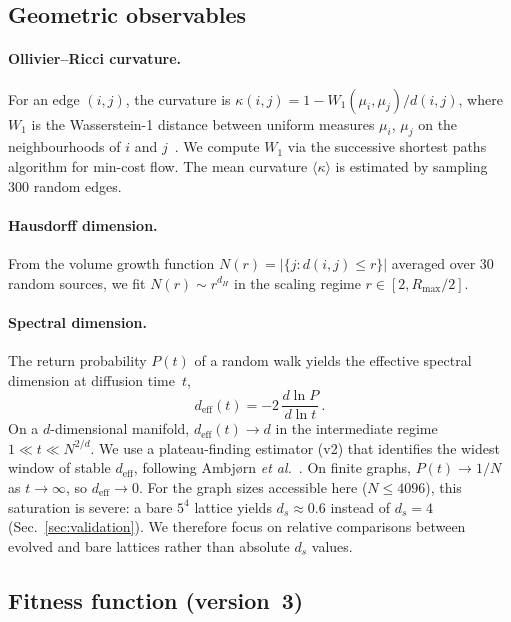 \documentclass[aps,prd,twocolumn,superscriptaddress,floatfix]{revtex4-2}
\begin{document}
\subsection{Geometric observables}
\label{sec:observables}

\paragraph{Ollivier--Ricci curvature.}
For an edge $(i,j)$, the curvature is
$\kappa(i,j) = 1 - W_1(\mu_i, \mu_j) / d(i,j)$, where $W_1$ is
the Wasserstein-1 distance between uniform measures $\mu_i$, $\mu_j$
on the neighbourhoods of $i$ and $j$~\cite{Ollivier2009,Lin2011}.
We compute $W_1$ via the successive shortest paths algorithm for
min-cost flow.  The mean curvature
$\langle\kappa\rangle$ is estimated by sampling 300 random edges.

\paragraph{Hausdorff dimension.}
From the volume growth function $N(r) = |\{j : d(i,j) \leq r\}|$
averaged over 30 random sources, we fit $N(r) \sim r^{d_H}$ in the
scaling regime $r \in [2, R_{\max}/2]$.

\paragraph{Spectral dimension.}
The return probability $P(t)$ of a random walk yields the effective
spectral dimension at diffusion time~$t$,
\begin{equation}
  d_{\mathrm{eff}}(t) = -2\,\frac{d\ln P}{d\ln t} \,.
\end{equation}
On a $d$-dimensional manifold, $d_{\mathrm{eff}}(t) \to d$ in the
intermediate regime $1 \ll t \ll N^{2/d}$.  We use a plateau-finding
estimator (v2) that identifies the widest window of stable
$d_{\mathrm{eff}}$, following Ambj{\o}rn
\emph{et al.}~\cite{Ambjorn2005}.  On finite graphs, $P(t) \to 1/N$
as $t \to \infty$, so $d_{\mathrm{eff}} \to 0$.  For the graph sizes
accessible here ($N \le 4096$), this saturation is severe: a bare
$5^4$ lattice yields $d_s \approx 0.6$ instead of $d_s = 4$
(Sec.~\ref{sec:validation}).  We therefore focus on relative
comparisons between evolved and bare lattices rather than absolute
$d_s$ values.

\subsection{Fitness function (version~3)}
\label{sec:fitness}
\end{document}
